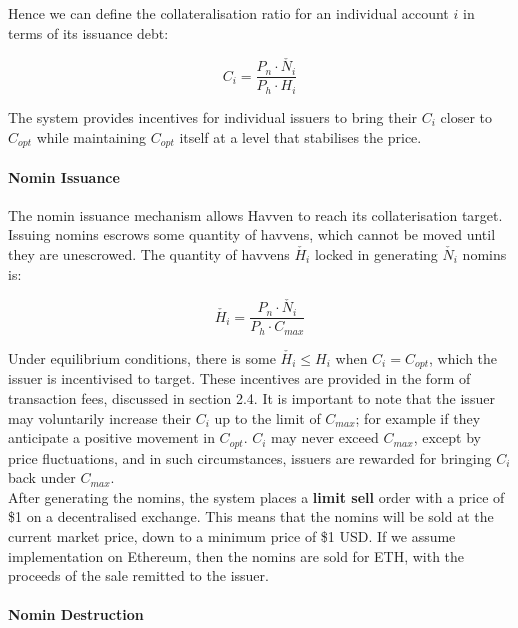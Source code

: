 \noindent Hence we can define the collateralisation ratio for an individual account $i$ in terms of its issuance debt:

\begin{equation}
C_i = \frac{P_n \cdot \check{N_i}}{P_h \cdot H_i}  \label{eq:individualcollat}
\end{equation}

\noindent The system provides incentives for individual issuers to bring their $C_i$ closer to $C_{opt}$ while maintaining $C_{opt}$ itself at a level that stabilises the price.

\paragraph{Nomin Issuance}

\noindent The nomin issuance mechanism allows Havven to reach its collaterisation target. Issuing nomins escrows some quantity of havvens, which cannot be moved until they are unescrowed. The quantity of havvens $\check{H_i}$ locked in generating $\check{N_i}$ nomins is:

\begin{equation}
\check{H_i} = \frac{P_n \cdot \check{N_i}}{P_h \cdot C_{max}}  \label{eq:escrowed}
\end{equation}

\noindent Under equilibrium conditions, there is some $\check{H_i} \leq H_i$ when $C_i = C_{opt}$, which the issuer is incentivised to target. These incentives are provided in the form of transaction fees, discussed in section 2.4. It is important to note that the issuer may voluntarily increase their $C_i$ up to the limit of $C_{max}$; for example if they anticipate a positive movement in $C_{opt}$. $C_i$ may never exceed $C_{max}$, except by price fluctuations, and in such circumstances, issuers are rewarded for bringing $C_i$ back under $C_{max}$. \\

\noindent After generating the nomins, the system places a \textbf{limit sell} order with a price of \$1 on a decentralised exchange. This means that the nomins will be sold at the current market price, down to a minimum price of \$1 USD. If we assume implementation on Ethereum, then the nomins are sold for ETH, with the proceeds of the sale remitted to the issuer.

\paragraph{Nomin Destruction}

